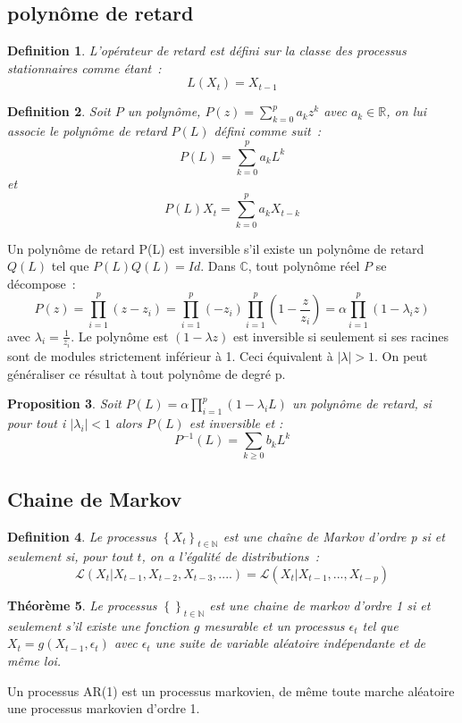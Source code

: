 \documentclass[11pt]{scrartcl} %
\newtheorem{theorem}{Théorème}[section]
\newtheorem{Def}[theorem]{Definition}
\newtheorem{pro}[theorem]{Proposition}
\begin{document}
\subsection{polynôme de retard}
\begin{Def}
L'opérateur de retard est défini sur la classe des processus stationnaires comme étant~: 
$$
L(X_t)=X_{t-1}
$$
\end{Def}
\begin{Def}
Soit $P$ un polynôme, $P(z)=\sum_{k=0}^{p}a_kz^k$ avec $a_k\in\mathbb{R}$, on lui associe le polynôme de retard $P(L)$ défini comme suit~:
$$
P(L)=\sum_{k=0}^pa_kL^k
$$
et 
$$
P(L)X_t=\sum_{k=0}^pa_kX_{t-k}
$$
\end{Def}
Un polynôme de retard P(L) est inversible s'il existe un polynôme de retard $Q(L)$ tel que $P(L)Q(L)=Id$. Dans $\mathbb{C}$, tout polynôme réel $P$ se décompose~:
$$
P(z)=\prod_{i=1}^p(z-z_i)=\prod_{i=1}^p(-z_i)\prod_{i=1}^p(1-\frac{z}{z_i})=\alpha\prod_{i=1}^p(1-\lambda_i z)
$$
avec $\lambda_i=\frac{1}{z_i}$.
Le polynôme est $(1-\lambda z)$ est inversible si seulement si ses racines sont de modules strictement inférieur à 1. Ceci équivalent à $|\lambda|>1$. On peut généraliser ce résultat à tout polynôme de degré p.
\begin{pro}
Soit $P(L) = \alpha\prod_{i=1}^p(1-\lambda_i L)$ un polynôme de retard, si pour tout i $|\lambda_i|<1$ alors $P(L)$ est inversible et :
$$
P^{-1}(L)= \sum_{k\geq 0}b_kL^k
$$
\end{pro}

\subsection{Chaine de Markov}
\begin{Def}
Le processus $\left\{X_t\right\}_{t\in\mathbb{N}}$ est une chaîne de Markov d'ordre p si et seulement si, pour tout $t$, on a l'égalité de distributions~:
$$
\mathcal{L}\left(X_t|X_{t-1},X_{t-2},X_{t-3},....\right) = \mathcal{L}\left(X_t|X_{t-1},...,X_{t-p}\right)
$$
\end{Def}
\begin{theorem}
Le processus $\left\{\right\}_{t\in\mathbb{N}}$ est une chaine de markov d'ordre 1 si et seulement s'il existe une fonction $g$ mesurable et un processus $\epsilon_t$ tel que $X_t=g(X_{t-1},\epsilon_t)$ avec $\epsilon_t$ une suite de variable aléatoire indépendante et de même loi.
\end{theorem}
Un processus AR(1) est un processus markovien, de même toute marche aléatoire une processus markovien d'ordre 1.


%

\end{document}
